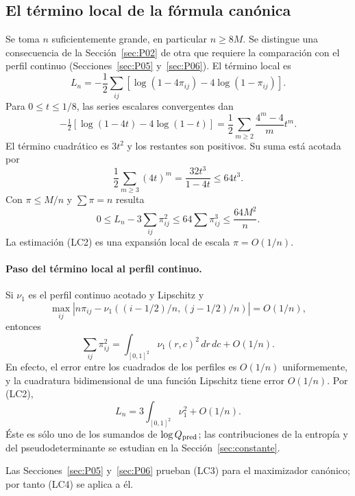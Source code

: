 \subsection{El término local de la fórmula canónica}\label{sec:P04}
Se toma $n$ suficientemente grande, en particular $n\ge8M$.
Se distingue una consecuencia de la Sección~\ref{sec:P02} de otra que requiere
la comparación con el perfil continuo (Secciones~\ref{sec:P05} y~\ref{sec:P06}).
El término local es
\[
 L_n=-\frac12\sum_{ij}
       [\log(1-4\pi_{ij})-4\log(1-\pi_{ij})].       \tag{LC1}
\]
Para $0\le t\le1/8$, las series escalares convergentes dan
\[
 -\tfrac12[\log(1-4t)-4\log(1-t)]
   =\frac12\sum_{m\ge2}\frac{4^m-4}{m}t^m.
\]
El término cuadrático es $3t^2$ y los restantes son positivos.
Su suma está acotada por
\[
 \frac12\sum_{m\ge3}(4t)^m
       =\frac{32t^3}{1-4t}\le64t^3.
\]
Con $\pi\le M/n$ y $\sum\pi=n$ resulta
\[
 0\le L_n-3\sum_{ij}\pi_{ij}^2
       \le64\sum\pi_{ij}^3\le\frac{64M^2}{n}.      \tag{LC2}
\]
La estimación (LC2) es una expansión local de escala $\pi=O(1/n)$.

\paragraph{Paso del término local al perfil continuo.}
Si $\nu_1$ es el perfil continuo acotado y Lipschitz y
\[
 \max_{ij}|n\pi_{ij}-\nu_1((i-1/2)/n,(j-1/2)/n)|=O(1/n),
                                                        \tag{LC3}
\]
entonces
\[
 \sum_{ij}\pi_{ij}^2
       =\int_{[0,1]^2}\nu_1(r,c)^2\,dr\,dc+O(1/n).
\]
En efecto, el error entre los cuadrados de los perfiles
es $O(1/n)$ uniformemente, y la cuadratura bidimensional
de una función Lipschitz tiene error $O(1/n)$.
Por (LC2),
\[
 L_n=3\int_{[0,1]^2}\nu_1^2+O(1/n).               \tag{LC4}
\]
Éste es sólo uno de los sumandos de $\log Q_{\rm pred}$; las contribuciones de la entropía y
del pseudodeterminante se estudian en la Sección~\ref{sec:constante}.

Las Secciones~\ref{sec:P05} y~\ref{sec:P06} prueban (LC3) para el maximizador canónico;
por tanto (LC4) se aplica a él.
